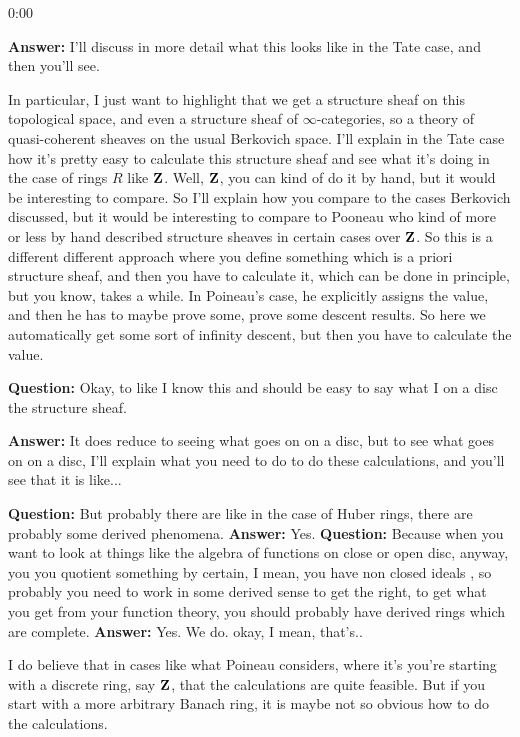 \begin{unfinished}{0:00}
{%
\textbf{Answer:} I'll discuss in more detail what this looks like in the Tate case, and then you'll see.

In particular, I just want to highlight that we get a structure sheaf on this topological space, and even a structure sheaf of $\infty$-categories, so a theory of quasi-coherent sheaves on the usual Berkovich space. 
I'll explain in the Tate case how it's pretty easy to calculate this structure sheaf and see what it's doing in the case of rings $R$ like $\mathbf Z$. Well, $\mathbf Z$, you can kind of do it by hand, but it would be interesting to compare. 
So I'll explain how you compare to the cases Berkovich discussed, but it would be interesting to compare to Pooneau \citeme{} who kind of more or less by hand described structure sheaves in certain cases over $\mathbf Z$. So this is a different different approach where you define something which is a priori structure sheaf, and then you have to calculate it, which can be done in principle, but you know, takes a while. In Poineau's case, he explicitly assigns the value, and then he has to maybe prove some, prove some descent results. So here we automatically get some sort of infinity descent, but then you have to calculate the value.

\textbf{Question:} Okay, to like I know this and should be easy to say what I on a disc the structure sheaf. 

\textbf{Answer:} It does reduce to seeing what goes on on a disc, but to see what goes on on a disc, I'll explain what you need to do to do these calculations, and you'll see that it is like...

\textbf{Question:} But probably there are like in the case of Huber rings, there are probably some derived phenomena.
\textbf{Answer:} Yes.
\textbf{Question:} Because when you want to look at things like the algebra of functions on close or open disc, anyway, you you quotient something by certain, I mean, you have non closed ideals , so probably you need to work in some derived sense to get the right, to get what you get from your function theory, you should probably have derived rings which are complete. 
\textbf{Answer:} Yes. We do. okay, I mean, that's..

I do believe that in cases like what Poineau considers, where it's you're starting with a discrete ring, say $\mathbf Z$, that the calculations are quite feasible.
But if you start with a more arbitrary Banach ring, it is maybe not so obvious how to do the calculations.

}
\end{unfinished}
